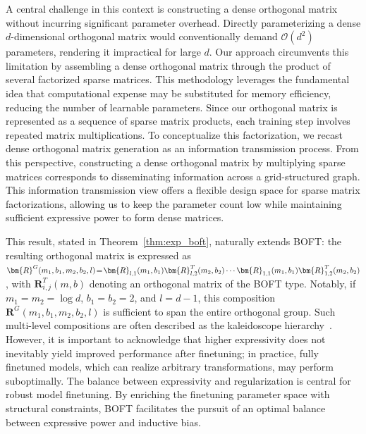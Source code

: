 A central challenge in this context is constructing a dense orthogonal matrix without incurring significant parameter overhead. Directly parameterizing a dense $d$-dimensional orthogonal matrix would conventionally demand $\mathcal{O}(d^2)$ parameters, rendering it impractical for large $d$. Our approach circumvents this limitation by assembling a dense orthogonal matrix through the product of several factorized sparse matrices. This methodology leverages the fundamental idea that computational expense may be substituted for memory efficiency, reducing the number of learnable parameters. Since our orthogonal matrix is represented as a sequence of sparse matrix products, each training step involves repeated matrix multiplications. To conceptualize this factorization, we recast dense orthogonal matrix generation as an information transmission process. From this perspective, constructing a dense orthogonal matrix by multiplying sparse matrices corresponds to disseminating information across a grid-structured graph. This information transmission view offers a flexible design space for sparse matrix factorizations, allowing us to keep the parameter count low while maintaining sufficient expressive power to form dense matrices.

This result, stated in Theorem~\ref{thm:exp_boft}, naturally extends BOFT: the resulting orthogonal matrix is expressed as $\thickmuskip=2mu \medmuskip=2mu \bm{R}^G(m_1,b_1,m_2,b_2,l)=\bm{R}_{l,1}(m_1,b_1)\bm{R}_{l,2}^T(m_2,b_2)\cdots\bm{R}_{1,1}(m_1,b_1)\bm{R}_{1,2}^T(m_2,b_2)$, with $\bm{R}_{i,j}^T(m,b)$ denoting an orthogonal matrix of the BOFT type. Notably, if $m_1=m_2=\log d$, $b_1=b_2=2$, and $l=d-1$, this composition $\bm{R}^G(m_1,b_1,m_2,b_2,l)$ is sufficient to span the entire orthogonal group. Such multi-level compositions are often described as the kaleidoscope hierarchy~\cite{dao2019kaleidoscope}. However, it is important to acknowledge that higher expressivity does not inevitably yield improved performance after finetuning; in practice, fully finetuned models, which can realize arbitrary transformations, may perform suboptimally. The balance between expressivity and regularization is central for robust model finetuning. By enriching the finetuning parameter space with structural constraints, BOFT facilitates the pursuit of an optimal balance between expressive power and inductive bias.

